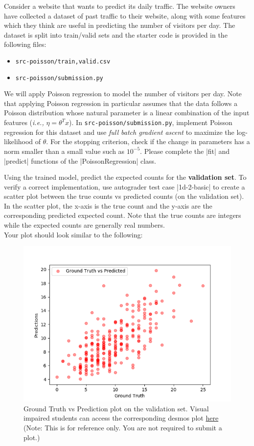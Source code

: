 \item {}

Consider a website that wants to predict its daily traffic. The website owners have collected a dataset of past traffic to their website, along with some features which they think are useful in
predicting the number of visitors per day. The dataset is split into train/valid sets and the starter code is provided in the following files:
\begin{center}
    \begin{itemize}
        \item 	\texttt{src-poisson/{train,valid}.csv}
        \item   \texttt{src-poisson/submission.py}
    \end{itemize}
\end{center}
We will apply Poisson regression to model the number of visitors per day. Note that applying Poisson regression in particular assumes that the data follows a Poisson distribution whose natural parameter is a linear combination of the input features (\emph{i.e.,} $\eta = \theta^T x$). In \texttt{src-poisson/submission.py}, implement Poisson regression for this dataset and use \emph{full batch gradient ascent} to maximize the log-likelihood of $\theta$. For the stopping criterion, check if the change in parameters has a norm smaller than a small value such as $10^{-5}$. Please complete the |fit| and |predict| functions of the |PoissonRegression| class. 

Using the trained model, predict the expected counts for the \textbf{validation set}.  To verify a correct implementation, use autograder test case |1d-2-basic| to create a scatter plot between the true counts vs predicted counts (on the validation set). In the scatter plot, the x-axis is the true count and the y-axis are the corresponding predicted expected count. Note that the true counts are integers while the expected counts are generally real numbers.\\

Your plot should look similar to the following:

\begin{figure}[H]
	\centering
	\vspace{-2mm}
	\includegraphics[width=0.65\linewidth]{01-poisson/poisson_val.png}
	\caption{Ground Truth vs Prediction plot on the validation set. Visual impaired students can access the corresponding desmos plot \href{https://www.desmos.com/calculator/3malx1qtog}{here} (Note: This is for reference only.  You are not required to submit a plot.)}
\end{figure}